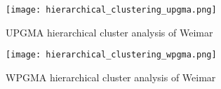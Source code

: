 \begin{figure}
    \centering
    \begin{mdframed}[style=mdthight]
        \texttt{[image: hierarchical\_clustering\_upgma.png]}
    \end{mdframed}
    \caption{UPGMA hierarchical cluster analysis of Weimar\label{fig:hierarchical_clustering_upgma}}
\end{figure}


\begin{figure}
    \centering
    \begin{mdframed}[style=mdthight]
        \texttt{[image: hierarchical\_clustering\_wpgma.png]}
    \end{mdframed}
    \caption{WPGMA hierarchical cluster analysis of Weimar\label{fig:hierarchical_clustering_wpgma}}
\end{figure}
